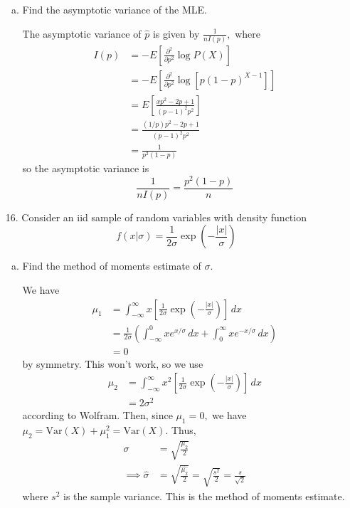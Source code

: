 \documentclass{article}
\newcommand{\var}{\mathrm{Var}}
\begin{document}
\begin{itemize}
\begin{enumerate}[(a)]
			\item Find the asymptotic variance of the MLE.
				\begin{soln}
					The asymptotic variance of $\hat{p}$ is given by $\frac{1}{nI(p)},$ where 
					\begin{align*}
						I(p)&=-E\left[ \frac{\partial^2}{\partial p^2}\log P(X) \right] \\
						&= -E\left[ \frac{\partial^2}{\partial p^2}\log[p(1-p)^{X-1}] \right] \\
						&= E\left[ \frac{xp^2-2p+1}{(p-1)^2p^2} \right] \\
						&= \frac{(1/p)p^2-2p+1}{(p-1)^2p^2} \\
						&= \frac{1}{p^2(1-p)}
					\end{align*}
					so the asymptotic variance is \[\frac{1}{nI(p)}=\boxed{\frac{p^2(1-p)}{n}}\]
				\end{soln}

				
		\end{enumerate}

	\item[16.] Consider an iid sample of random variables with density function \[f(x|\sigma) = \frac{1}{2\sigma}\exp{\left( -\frac{|x|}{\sigma} \right)}\]
		\begin{enumerate}[(a)]
			\item Find the method of moments estimate of $\sigma.$
				\begin{soln}
					We have 
					\begin{align*}
						\mu_1 &= \int_{-\infty}^{\infty} x\left[ \frac{1}{2\sigma}\exp{\left( -\frac{|x|}{\sigma} \right)} \right]\, dx \\
						&= \frac{1}{2\sigma}\left( \int_{-\infty}^0 xe^{x/\sigma}\, dx + \int_0^\infty xe^{-x/\sigma}\, dx \right) \\
						&= 0
					\end{align*} by symmetry. This won't work, so we use 
					\begin{align*}
						\mu_2 &= \int_{-\infty}^\infty x^2 \left[ \frac{1}{2\sigma}\exp{\left( -\frac{|x|}{\sigma} \right)} \right]\, dx \\
						&= 2\sigma^2
				\end{align*} according to Wolfram. Then, since $\mu_1=0,$ we have $\mu_2=\var(X)+\mu_1^2=\var(X).$ Thus,
				\begin{align*}
					\sigma &= \sqrt{\frac{\mu_2}{2}} \\
					\implies \hat{\sigma} &= \sqrt{\frac{\hat{\mu_2}}{2}} = \sqrt{\frac{s^2}{2}} = \frac{s}{\sqrt{2}}
				\end{align*} where $s^2$ is the sample variance. This is the method of moments estimate.


\end{soln}
\end{enumerate}
\end{itemize}
\end{document}
